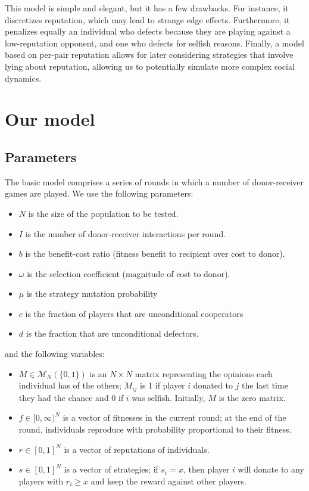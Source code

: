 \documentclass{amsart}
\begin{document}
This model is simple and elegant, but it has a few drawbacks. For instance, it discretizes reputation, which may lead to strange edge effects. Furthermore, it penalizes equally an individual who defects because they are playing against a low-reputation opponent, and one who defects for selfish reasons. Finally, a model based on per-pair reputation allows for later considering strategies that involve lying about reputation, allowing us to potentially simulate more complex social dynamics.

\section{Our model}

\subsection{Parameters}

The basic model comprises a series of rounds in which a number of donor-receiver games are played. We use the following parameters:

\begin{itemize}
\item $N$ is the size of the population to be tested.
\item $I$ is the number of donor-receiver interactions per round.
\item $b$ is the benefit-cost ratio (fitness benefit to recipient over cost to donor).
\item $\omega$ is the selection coefficient (magnitude of cost to donor).
\item $\mu$ is the strategy mutation probability
\item $c$ is the fraction of players that are unconditional cooperators
\item $d$ is the fraction that are unconditional defectors.
\end{itemize}

and the following variables:
\begin{itemize}
\item $M \in \mathcal{M}_N(\{0,1\})$ is an $N \times N$ matrix representing the opinions each individual has of the others; $M_{ij}$ is 1 if player $i$ donated to $j$ the last time they had the chance and 0 if $i$ was selfish. Initially, $M$ is the zero matrix.
\item $f \in [0, \infty)^N$ is a vector of fitnesses in the current round; at the end of the round, individuals reproduce with probability proportional to their fitness.
\item $r \in [0,1]^N$ is a vector of reputations of individuals.
\item $s \in [0,1]^N$ is a vector of strategies; if $s_i = x$, then player $i$ will donate to any players with $r_i \ge x$ and keep the reward against other players.
\end{itemize}
\end{document}
